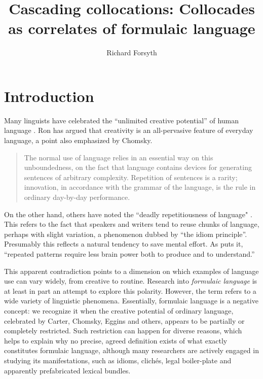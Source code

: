\documentclass[output=paper]{langscibook}
\author{Richard Forsyth\affiliation{}}%
\title{Cascading collocations: Collocades as correlates of formulaic language}
\begin{document}
\lstset{frame=lines}
\maketitle

\section{Introduction}\label{sec:forsyth:1}

Many linguists have celebrated the ``unlimited creative potential'' of human language \citep[117]{Eggins1994}. Ron \citet{Carter2004} has argued that creativity is an all-pervasive feature of everyday language, a point also emphasized by Chomsky.

\begin{quote}
The normal use of language relies in an essential way on this unboundedness, on the fact that language contains devices for generating sentences of arbitrary complexity. Repetition of sentences is a rarity; innovation, in accordance with the grammar of the language, is the rule in ordinary day-by-day performance. \citep[118]{Chomsky1972}\hbox{}
\end{quote}

On the other hand, others have noted the ``deadly repetitiousness of language" \citep[570]{Bolinger1965}. This refers to the fact that speakers and writers tend to reuse chunks of language, perhaps with slight variation, a phenomenon dubbed by \citet{Sinclair1991} ``the idiom principle''. Presumably this reflects a natural tendency to save mental effort. As \citet{Halliday_that_2014} puts it, ``repeated patterns require less brain power both to produce and to understand.''

This apparent contradiction points to a dimension on which examples of language use can vary widely, from creative to routine. Research into \textit{formulaic language} is at least in part an attempt to explore this polarity. However, the term refers to a wide variety of linguistic phenomena. Essentially, formulaic language is a negative concept: we recognize it when the creative potential of ordinary language, celebrated by Carter, Chomsky, Eggins and others, appears to be partially or completely restricted. Such restriction can happen for diverse reasons, which helps to explain why no precise, agreed definition exists of what exactly constitutes formulaic language, although many researchers are actively engaged in studying its manifestations, such as idioms, clichés, legal boiler-plate and apparently prefabricated lexical bundles.
\end{document}
